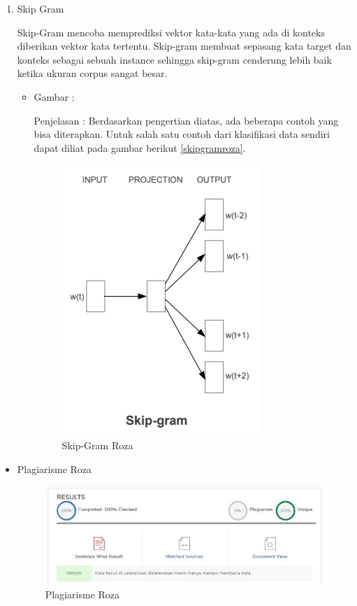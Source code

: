 \begin{enumerate}
\item Skip Gram
\par Skip-Gram mencoba memprediksi vektor kata-kata yang ada di konteks diberikan vektor kata tertentu. Skip-gram membuat sepasang kata target dan konteks sebagai sebuah instance sehingga skip-gram cenderung lebih baik ketika ukuran corpus sangat besar.
\par
\begin{itemize}
\item Gambar :
\par Penjelasan : Berdasarkan pengertian diatas, ada beberapa contoh yang bisa diterapkan. Untuk salah satu contoh dari klasifikasi data sendiri dapat diliat pada gambar berikut \ref{skipgramroza}.
\begin{figure}[!hbtp]
\centering
\includegraphics[scale=0.2]{figures/skipgramroza.png}
\caption{Skip-Gram Roza}
\label{text-fadila}
\end{figure}
\end{itemize}
\end{enumerate}

\begin{itemize}
\item Plagiarisme Roza
\begin{figure}[!hbtp]
\centering
\includegraphics[scale=0.2]{figures/plagiarismeroza.jpg}
\caption{Plagiarisme Roza}
\label{text-fadila}
\end{figure}
\end{itemize}


